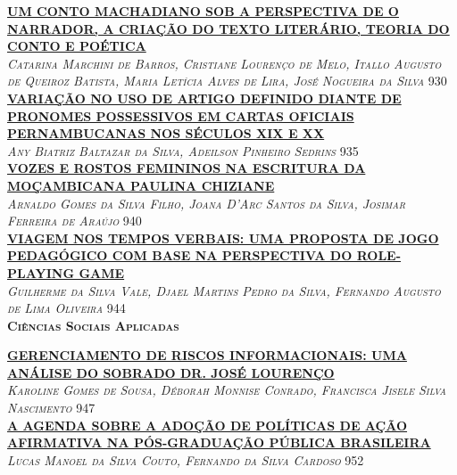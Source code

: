 \noindent \textsc{\hyperlink{trabalhos/251760.pdf.1}{\textbf{UM CONTO MACHADIANO SOB A PERSPECTIVA DE O NARRADOR, A CRIAÇÃO DO TEXTO LITERÁRIO, TEORIA DO CONTO E POÉTICA}}}\\ 
\noindent \textsc{\textit{Catarina Marchini de Barros, Cristiane Lourenço de Melo, Itallo Augusto de Queiroz Batista, Maria Letícia Alves de Lira, José Nogueira da Silva}} \hfill 930\\ 

\noindent \textsc{\hyperlink{trabalhos/249517.pdf.1}{\textbf{VARIAÇÃO NO USO DE ARTIGO DEFINIDO DIANTE DE PRONOMES POSSESSIVOS EM CARTAS OFICIAIS PERNAMBUCANAS NOS SÉCULOS XIX E XX}}}\\ 
\noindent \textsc{\textit{Any Biatriz Baltazar da Silva, Adeilson Pinheiro Sedrins}} \hfill 935\\ 

\noindent \textsc{\hyperlink{trabalhos/251332.pdf.1}{\textbf{VOZES E ROSTOS FEMININOS NA ESCRITURA DA MOÇAMBICANA PAULINA CHIZIANE}}}\\ 
\noindent \textsc{\textit{Arnaldo Gomes da Silva Filho, Joana D’Arc Santos da Silva, Josimar Ferreira de Araújo}} \hfill 940\\ 

\noindent \textsc{\hyperlink{trabalhos/249151.pdf.1}{\textbf{VIAGEM NOS TEMPOS VERBAIS: UMA PROPOSTA DE JOGO PEDAGÓGICO COM BASE NA PERSPECTIVA DO ROLE-PLAYING GAME}}}\\ 
\noindent \textsc{\textit{Guilherme da Silva Vale, Djael Martins Pedro da Silva, Fernando Augusto de Lima Oliveira}} \hfill 944\\ 


\vspace*{2cm} 
\noindent \textsc{\textbf{\LARGE Ciências Sociais Aplicadas}}\\ 
\vspace*{1cm} 

\noindent \textsc{\hyperlink{trabalhos/250229.pdf.1}{\textbf{ GERENCIAMENTO DE RISCOS INFORMACIONAIS: UMA ANÁLISE DO SOBRADO DR. JOSÉ LOURENÇO}}}\\ 
\noindent \textsc{\textit{Karoline Gomes de Sousa, Déborah Monnise Conrado, Francisca Jisele Silva Nascimento}} \hfill 947\\ 

\noindent \textsc{\hyperlink{trabalhos/244006.pdf.1}{\textbf{A AGENDA SOBRE A ADOÇÃO DE POLÍTICAS DE AÇÃO AFIRMATIVA NA  PÓS-GRADUAÇÃO PÚBLICA BRASILEIRA}}}\\ 
\noindent \textsc{\textit{Lucas Manoel da Silva Couto, Fernando da Silva Cardoso}} \hfill 952\\ 

